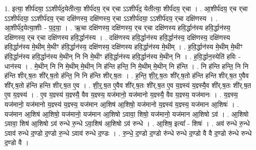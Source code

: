 \documentclass[17pt]{extarticle}
\begin{document}
1. इत्या॒ शीर्प॑दया॒ ऽऽशीर्प॑द॒येतीत्या॒ शीर्प॑दय॒ र्‌च र्‌चा ऽऽशीर्प॑द॒ येतीत्या॒ शीर्प॑दय॒ र्‌चा । . आ॒शीर्प॑दय॒ र्‌च र्‌चा ऽऽशीर्प॑दया॒ ऽऽशीर्प॑दय॒ र्‌चा दक्षि॑णस्य॒ दक्षि॑णस्य॒ र्‌चा ऽऽशीर्प॑दया॒ ऽऽशीर्प॑दय॒ र्‌चा दक्षि॑णस्य । . आ॒शीर्प॑द॒येत्या॒शीः - प॒द॒या॒ । . ऋ॒चा दक्षि॑णस्य॒ दक्षि॑णस्य॒ र्‌च र्‌चा दक्षि॑णस्य हवि॒र्द्धान॑स्य हवि॒र्द्धान॑स्य॒ दक्षि॑णस्य॒ र्‌च र्‌चा दक्षि॑णस्य हवि॒र्द्धान॑स्य । . दक्षि॑णस्य हवि॒र्द्धान॑स्य हवि॒र्द्धान॑स्य॒ दक्षि॑णस्य॒ दक्षि॑णस्य हवि॒र्द्धान॑स्य मे॒थीम् मे॒थीꣳ ह॑वि॒र्द्धान॑स्य॒ दक्षि॑णस्य॒ दक्षि॑णस्य हवि॒र्द्धान॑स्य मे॒थीम् । . ह॒वि॒र्द्धान॑स्य मे॒थीम् मे॒थीꣳ ह॑वि॒र्द्धान॑स्य हवि॒र्द्धान॑स्य मे॒थीन् नि नि मे॒थीꣳ ह॑वि॒र्द्धान॑स्य हवि॒र्द्धान॑स्य मे॒थीन् नि । . ह॒वि॒र्द्धान॒स्येति॑ हविः - धान॑स्य । . मे॒थीन् नि नि मे॒थीम् मे॒थीन् नि ह॑न्ति हन्ति॒ नि मे॒थीम् मे॒थीन् नि ह॑न्ति । . नि ह॑न्ति हन्ति॒ नि नि ह॑न्ति शीर्.ष॒तः शी॑र्.ष॒तो ह॑न्ति॒ नि नि ह॑न्ति शीर्.ष॒तः । . ह॒न्ति॒ शी॒र्॒.ष॒तः शी॑र्.ष॒तो ह॑न्ति हन्ति शीर्.ष॒त ए॒वैव शी॑र्.ष॒तो ह॑न्ति हन्ति शीर्.ष॒त ए॒व । . शी॒र्॒.ष॒त ए॒वैव शी॑र्.ष॒तः शी॑र्.ष॒त ए॒व य॒ज्ञ्स्य॑ य॒ज्ञ्स्यै॒व शी॑र्.ष॒तः शी॑र्.ष॒त ए॒व य॒ज्ञ्स्य॑ । . ए॒व य॒ज्ञ्स्य॑ य॒ज्ञ्स्यै॒ वैव य॒ज्ञ्स्य॒ यज॑मानो॒ यज॑मानो य॒ज्ञ्स्यै॒ वैव य॒ज्ञ्स्य॒ यज॑मानः । . य॒ज्ञ्स्य॒ यज॑मानो॒ यज॑मानो य॒ज्ञ्स्य॑ य॒ज्ञ्स्य॒ यज॑मान आ॒शिष॑ आ॒शिषो॒ यज॑मानो य॒ज्ञ्स्य॑ य॒ज्ञ्स्य॒ यज॑मान आ॒शिषः॑ । . यज॑मान आ॒शिष॑ आ॒शिषो॒ यज॑मानो॒ यज॑मान आ॒शिषो ऽवावा॒ शिषो॒ यज॑मानो॒ यज॑मान आ॒शिषो ऽव॑ । . आ॒शिषो ऽवावा॒ शिष॑ आ॒शिषो ऽव॑ रुन्धे रु॒न्धे ऽवा॒शिष॑ आ॒शिषो ऽव॑ रुन्धे । . आ॒शिष॒ इत्या᳚ - शिषः॑ । . अव॑ रुन्धे रु॒न्धे ऽवाव॑ रुन्धे द॒ण्डो द॒ण्डो रु॒न्धे ऽवाव॑ रुन्धे द॒ण्डः । . रु॒न्धे॒ द॒ण्डो द॒ण्डो रु॑न्धे रुन्धे द॒ण्डो वै वै द॒ण्डो रु॑न्धे रुन्धे द॒ण्डो वै । \newline
\end{document}
